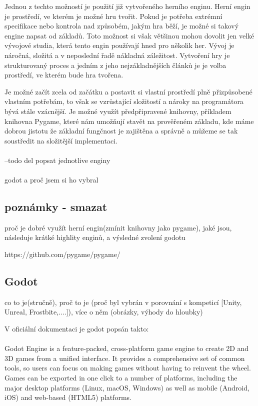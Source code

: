 	Jednou z techto možností je použití již vytvořeného herního enginu.
	Herní engin je prostředí, ve kterém je možné hru tvořit. Pokud je potřeba extrémní specifikace nebo kontrola nad způsobém, jakým hra běží, je možné si takový engine napsat od základů.
	Toto možnost si však většinou mohou dovolit jen velké vývojové studia, která tento engin používají hned pro několik her. Vývoj je náročná, složitá a v neposlední řadě nákladná záležitost.
	Vytvoření hry je strukturovaný proces a jedním z jeho nejzákladnějších článků je je volba prostředí, ve kterém bude hra tvořena.


	Je možné začít zcela od začátku a postavit si vlastní prostředí plně přizpůsobené vlastním potřebám, to však se vzrůstající složitostí a nároky na programátora bývá stále vzácnější.
	Je možné využít předpřipravené knihovny, příkladem knihovna Pygame\cite{pygame}, které nám umožňují stavět na prověřeném základu, kde máme dobrou jistotu že základní fungčnost je zajištěna a správně a můžeme se tak soustředit na složitější implementaci.

\paragraph{} --todo del popsat jednotlive enginy

\paragraph{} godot a proč jsem si ho vybral

	\subsection{poznámky - smazat}
	proč je dobré využít herní engin(zmínit knihovny jako pygame), jaké jsou, následuje krátké highlity enginů, a výsledné zvolení godotu

	https://github.com/pygame/pygame/

	\subsection{Godot}
	co to je(stručně), proč to je (proč byl vybrán  v porovnání s kompeticí [Unity, Unreal, Frostbite,....]), více o  něm (obrázky, výhody do hloubky)

	V oficiální dokumentaci je godot popsán takto:

		\paragraph{}
		Godot Engine is a feature-packed, cross-platform game engine to create 2D and 3D games from a unified interface. It provides a comprehensive set of common tools, so users can focus on making games without having to reinvent the wheel. Games can be exported in one click to a number of platforms, including the major desktop platforms (Linux, macOS, Windows) as well as mobile (Android, iOS) and web-based (HTML5) platforms.

